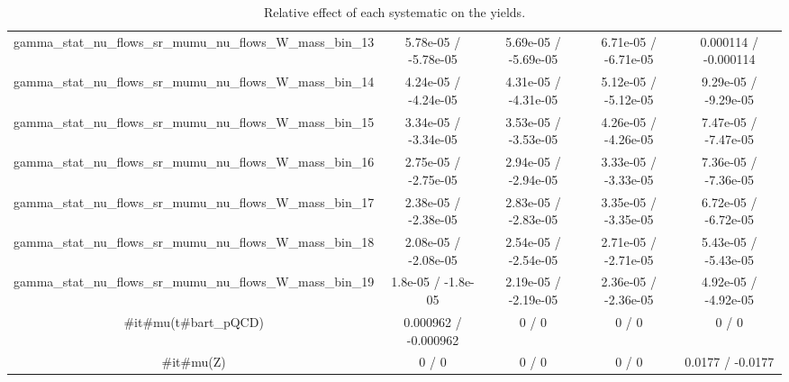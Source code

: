\documentclass[10pt]{article}
\begin{document}
\begin{table}[htbp]
\begin{center}
\begin{tabular}{|c|c|c|c|c|}
  gamma_stat_nu_flows_sr_mumu_nu_flows_W_mass_bin_13 & 5.78e-05 / -5.78e-05 & 5.69e-05 / -5.69e-05 & 6.71e-05 / -6.71e-05 & 0.000114 / -0.000114 \\ 
  gamma_stat_nu_flows_sr_mumu_nu_flows_W_mass_bin_14 & 4.24e-05 / -4.24e-05 & 4.31e-05 / -4.31e-05 & 5.12e-05 / -5.12e-05 & 9.29e-05 / -9.29e-05 \\ 
  gamma_stat_nu_flows_sr_mumu_nu_flows_W_mass_bin_15 & 3.34e-05 / -3.34e-05 & 3.53e-05 / -3.53e-05 & 4.26e-05 / -4.26e-05 & 7.47e-05 / -7.47e-05 \\ 
  gamma_stat_nu_flows_sr_mumu_nu_flows_W_mass_bin_16 & 2.75e-05 / -2.75e-05 & 2.94e-05 / -2.94e-05 & 3.33e-05 / -3.33e-05 & 7.36e-05 / -7.36e-05 \\ 
  gamma_stat_nu_flows_sr_mumu_nu_flows_W_mass_bin_17 & 2.38e-05 / -2.38e-05 & 2.83e-05 / -2.83e-05 & 3.35e-05 / -3.35e-05 & 6.72e-05 / -6.72e-05 \\ 
  gamma_stat_nu_flows_sr_mumu_nu_flows_W_mass_bin_18 & 2.08e-05 / -2.08e-05 & 2.54e-05 / -2.54e-05 & 2.71e-05 / -2.71e-05 & 5.43e-05 / -5.43e-05 \\ 
  gamma_stat_nu_flows_sr_mumu_nu_flows_W_mass_bin_19 & 1.8e-05 / -1.8e-05 & 2.19e-05 / -2.19e-05 & 2.36e-05 / -2.36e-05 & 4.92e-05 / -4.92e-05 \\ 
  #it{#mu}(t#bar{t}_{pQCD}) & 0.000962 / -0.000962 & 0 / 0 & 0 / 0 & 0 / 0 \\ 
  #it{#mu}(Z) & 0 / 0 & 0 / 0 & 0 / 0 & 0.0177 / -0.0177 \\ 
\hline 
\end{tabular} 
\caption{Relative effect of each systematic on the yields.} 
\end{center} 
\end{table} 
\end{document}

